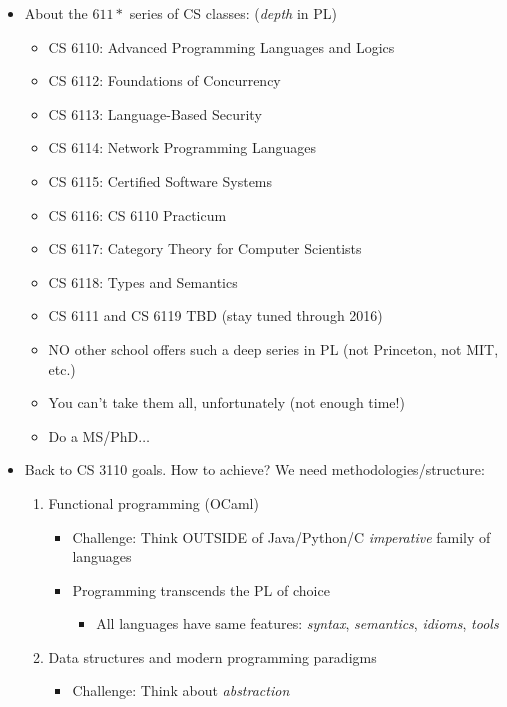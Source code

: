 \begin{itemize}
\begin{itemize}
    \end{itemize}
    \item About the $611*$ series of CS classes: (\textit{depth} in PL)
    \begin{itemize}
        \item CS 6110: Advanced Programming Languages and Logics
        \item CS 6112: Foundations of Concurrency
        \item CS 6113: Language-Based Security
        \item CS 6114: Network Programming Languages
        \item CS 6115: Certified Software Systems
        \item CS 6116: CS 6110 Practicum
        \item CS 6117: Category Theory for Computer Scientists
        \item CS 6118: Types and Semantics
        \item CS 6111 and CS 6119 TBD (stay tuned through 2016)
        \item NO other school offers such a deep series in PL (not Princeton, not MIT, etc.)
        \item You can't take them all, unfortunately (not enough time!)
        \item Do a MS/PhD$\ldots$
    \end{itemize}
    \item Back to CS 3110 goals. How to achieve? We need methodologies/structure:
    \begin{enumerate}
        \item Functional programming (\textsf{OCaml})
        \begin{itemize}
            \item Challenge: Think OUTSIDE of \textsf{Java}/\textsf{Python}/\textsf{C} \textit{imperative} family of languages
            \item Programming transcends the PL of choice
            \begin{itemize}
                \item All languages have same features: \textit{syntax}, \textit{semantics}, \textit{idioms}, \textit{tools}
            \end{itemize}
        \end{itemize}
        \item Data structures and modern programming paradigms
        \begin{itemize}
            \item Challenge: Think about \textit{abstraction}

\end{itemize}
\end{enumerate}
\end{itemize}
